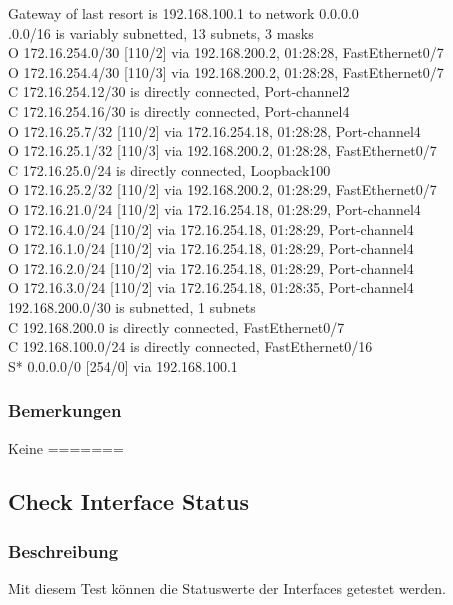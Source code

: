 \documentclass[a4,12pt]{scrartcl}
\begin{document}
\noindent Gateway of last resort is 192.168.100.1 to network 0.0.0.0\\

.0.0/16 is variably subnetted, 13 subnets, 3 masks\\
O       172.16.254.0/30 [110/2] via 192.168.200.2, 01:28:28, FastEthernet0/7\\
O       172.16.254.4/30 [110/3] via 192.168.200.2, 01:28:28, FastEthernet0/7\\
C       172.16.254.12/30 is directly connected, Port-channel2\\
C       172.16.254.16/30 is directly connected, Port-channel4\\
O       172.16.25.7/32 [110/2] via 172.16.254.18, 01:28:28, Port-channel4\\
O       172.16.25.1/32 [110/3] via 192.168.200.2, 01:28:28, FastEthernet0/7\\
C       172.16.25.0/24 is directly connected, Loopback100\\
O       172.16.25.2/32 [110/2] via 192.168.200.2, 01:28:29, FastEthernet0/7\\
O       172.16.21.0/24 [110/2] via 172.16.254.18, 01:28:29, Port-channel4\\
O       172.16.4.0/24 [110/2] via 172.16.254.18, 01:28:29, Port-channel4\\
O       172.16.1.0/24 [110/2] via 172.16.254.18, 01:28:29, Port-channel4\\
O       172.16.2.0/24 [110/2] via 172.16.254.18, 01:28:29, Port-channel4\\
O       172.16.3.0/24 [110/2] via 172.16.254.18, 01:28:35, Port-channel4\\
     192.168.200.0/30 is subnetted, 1 subnets\\
C       192.168.200.0 is directly connected, FastEthernet0/7\\
C    192.168.100.0/24 is directly connected, FastEthernet0/16\\
S*   0.0.0.0/0 [254/0] via 192.168.100.1
\subsubsection{Bemerkungen}
Keine
=======
\subsection{Check Interface Status}
\subsubsection{Beschreibung}
Mit diesem Test können die Statuswerte der Interfaces getestet werden.
\end{document}
